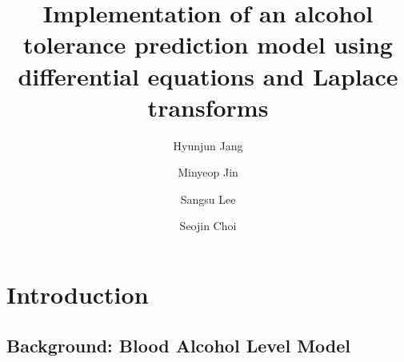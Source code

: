 \documentclass[11pt]{article}
\begin{document}
\title{Implementation of an alcohol tolerance prediction model using differential equations and Laplace transforms}

\author[1]{Hyunjun Jang}
\author[1]{Minyeop Jin}
\author[1]{Sangsu Lee}
\author[1]{Seojin Choi}

\maketitle



\section{Introduction}

\subsection{Background: Blood Alcohol Level Model}
\end{document}
